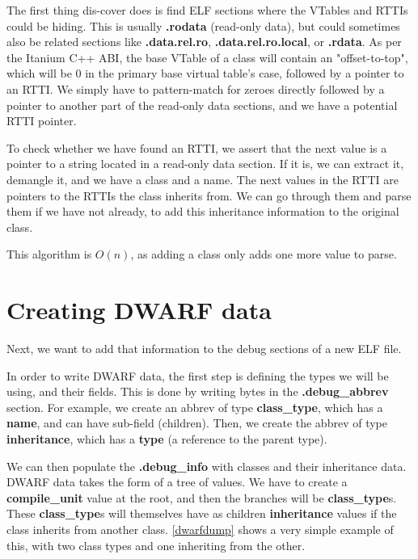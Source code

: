 \documentclass[a4paper,11pt,oneside]{report}
\begin{document}
The first thing dis-cover does is find ELF sections where the VTables and RTTIs could be hiding.
This is usually \textbf{.rodata} (read-only data), but could sometimes also be related sections like \textbf{.data.rel.ro}, \textbf{.data.rel.ro.local}, or \textbf{.rdata}.
As per the Itanium C++ ABI, the base VTable of a class will contain an "offset-to-top", which will be 0 in the primary base virtual table's case, followed by a pointer to an RTTI.
We simply have to pattern-match for zeroes directly followed by a pointer to another part of the read-only data sections, and we have a potential RTTI pointer.

To check whether we have found an RTTI, we assert that the next value is a pointer to a string located in a read-only data section.
If it is, we can extract it, demangle it, and we have a class and a name.
The next values in the RTTI are pointers to the RTTIs the class inherits from.
We can go through them and parse them if we have not already, to add this inheritance information to the original class.

This algorithm is $O(n)$, as adding a class only adds one more value to parse.

\section{Creating DWARF data}

Next, we want to add that information to the debug sections of a new ELF file.

In order to write DWARF data, the first step is defining the types we will be using, and their fields.
This is done by writing bytes in the \textbf{.debug\_abbrev} section.
For example, we create an abbrev of type \textbf{class\_type}, which has a \textbf{name}, and can have sub-field (children).
Then, we create the abbrev of type \textbf{inheritance}, which has a \textbf{type} (a reference to the parent type).

We can then populate the \textbf{.debug\_info} with classes and their inheritance data.
DWARF data takes the form of a tree of values. We have to create a \textbf{compile\_unit} value at the root, and then the branches will be \textbf{class\_type}s.
These \textbf{class\_type}s will themselves have as children \textbf{inheritance} values if the class inherits from another class.
\autoref{dwarfdump} shows a very simple example of this, with two class types and one inheriting from the other.
\end{document}
